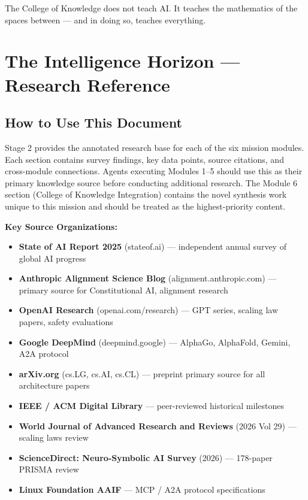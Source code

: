 \documentclass[11pt,letterpaper]{article}
\newcommand{\stageheader}[2]{%
  \noindent\colorbox{#2}{\makebox[\textwidth][l]{%
    \textcolor{white}{\bfseries\sffamily\hspace{6pt}#1\hspace{6pt}}}}%
  \vspace{0.5em}\par%
}
\begin{document}
The College of Knowledge does not teach AI. It teaches the mathematics of the spaces between — and in doing so, teaches everything.

\newpage

\stageheader{STAGE 2 \textemdash{} RESEARCH REFERENCE}{secondary}

\section{The Intelligence Horizon --- Research Reference}

\subsection{How to Use This Document}

Stage 2 provides the annotated research base for each of the six mission modules. Each section contains survey findings, key data points, source citations, and cross-module connections. Agents executing Modules 1--5 should use this as their primary knowledge source before conducting additional research. The Module 6 section (College of Knowledge Integration) contains the novel synthesis work unique to this mission and should be treated as the highest-priority content.

\textbf{Key Source Organizations:}
\begin{itemize}[leftmargin=*]
\item \textbf{State of AI Report 2025} (stateof.ai) --- independent annual survey of global AI progress
\item \textbf{Anthropic Alignment Science Blog} (alignment.anthropic.com) --- primary source for Constitutional AI, alignment research
\item \textbf{OpenAI Research} (openai.com/research) --- GPT series, scaling law papers, safety evaluations
\item \textbf{Google DeepMind} (deepmind.google) --- AlphaGo, AlphaFold, Gemini, A2A protocol
\item \textbf{arXiv.org} (cs.LG, cs.AI, cs.CL) --- preprint primary source for all architecture papers
\item \textbf{IEEE / ACM Digital Library} --- peer-reviewed historical milestones
\item \textbf{World Journal of Advanced Research and Reviews} (2026 Vol 29) --- scaling laws review
\item \textbf{ScienceDirect: Neuro-Symbolic AI Survey} (2026) --- 178-paper PRISMA review
\item \textbf{Linux Foundation AAIF} --- MCP / A2A protocol specifications
\end{itemize}
\end{document}
